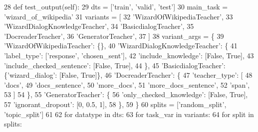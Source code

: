 \begin{DoxyCode}
28     \textcolor{keyword}{def }test\_output(self):
29         dts = [\textcolor{stringliteral}{'train'}, \textcolor{stringliteral}{'valid'}, \textcolor{stringliteral}{'test'}]
30         main\_task = \textcolor{stringliteral}{'wizard\_of\_wikipedia'}
31         variants = [
32             \textcolor{stringliteral}{'WizardOfWikipediaTeacher'},
33             \textcolor{stringliteral}{'WizardDialogKnowledgeTeacher'},
34             \textcolor{stringliteral}{'BasicdialogTeacher'},
35             \textcolor{stringliteral}{'DocreaderTeacher'},
36             \textcolor{stringliteral}{'GeneratorTeacher'},
37         ]
38         variant\_args = \{
39             \textcolor{stringliteral}{'WizardOfWikipediaTeacher'}: \{\},
40             \textcolor{stringliteral}{'WizardDialogKnowledgeTeacher'}: \{
41                 \textcolor{stringliteral}{'label\_type'}: [\textcolor{stringliteral}{'response'}, \textcolor{stringliteral}{'chosen\_sent'}],
42                 \textcolor{stringliteral}{'include\_knowledge'}: [\textcolor{keyword}{False}, \textcolor{keyword}{True}],
43                 \textcolor{stringliteral}{'include\_checked\_sentence'}: [\textcolor{keyword}{False}, \textcolor{keyword}{True}],
44             \},
45             \textcolor{stringliteral}{'BasicdialogTeacher'}: \{\textcolor{stringliteral}{'wizard\_dialog'}: [\textcolor{keyword}{False}, \textcolor{keyword}{True}]\},
46             \textcolor{stringliteral}{'DocreaderTeacher'}: \{
47                 \textcolor{stringliteral}{'teacher\_type'}: [
48                     \textcolor{stringliteral}{'docs'},
49                     \textcolor{stringliteral}{'docs\_sentence'},
50                     \textcolor{stringliteral}{'more\_docs'},
51                     \textcolor{stringliteral}{'more\_docs\_sentence'},
52                     \textcolor{stringliteral}{'span'},
53                 ]
54             \},
55             \textcolor{stringliteral}{'GeneratorTeacher'}: \{
56                 \textcolor{stringliteral}{'only\_checked\_knowledge'}: [\textcolor{keyword}{False}, \textcolor{keyword}{True}],
57                 \textcolor{stringliteral}{'ignorant\_dropout'}: [0, 0.5, 1],
58             \},
59         \}
60         splits = [\textcolor{stringliteral}{'random\_split'}, \textcolor{stringliteral}{'topic\_split'}]
61 
62         \textcolor{keywordflow}{for} datatype \textcolor{keywordflow}{in} dts:
63             \textcolor{keywordflow}{for} task\_var \textcolor{keywordflow}{in} variants:
64                 \textcolor{keywordflow}{for} split \textcolor{keywordflow}{in} splits:

\end{DoxyCode}
